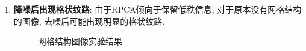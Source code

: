 \documentclass[10pt]{article}
\begin{document}
		\begin{enumerate}
			\item \textbf{降噪后出现格状纹路}: 由于RPCA倾向于保留低秩信息, 对于原本没有网格结构的图像, 去噪后可能出现明显的格状纹路.
				\begin{figure}[htbp]
					\centering
					\caption{网格结构图像实验结果}
				\end{figure}


\end{enumerate}
\end{document}
